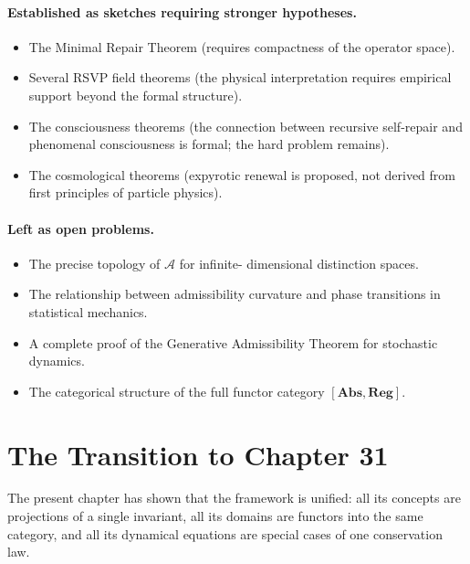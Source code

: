 \documentclass[12pt,twoside,openright]{book}
\newcommand{\adm}{\mathcal{A}}
\begin{document}
\paragraph{Established as sketches requiring stronger
hypotheses.}
\begin{itemize}
  \item The Minimal Repair Theorem
        (requires compactness of the operator space).
  \item Several RSVP field theorems
        (the physical interpretation requires empirical
        support beyond the formal structure).
  \item The consciousness theorems
        (the connection between recursive self-repair
        and phenomenal consciousness is formal;
        the hard problem remains).
  \item The cosmological theorems
        (expyrotic renewal is proposed, not derived
        from first principles of particle physics).
\end{itemize}

\paragraph{Left as open problems.}
\begin{itemize}
  \item The precise topology of $\adm$ for infinite-
        dimensional distinction spaces.
  \item The relationship between admissibility curvature
        and phase transitions in statistical mechanics.
  \item A complete proof of the Generative Admissibility
        Theorem for stochastic dynamics.
  \item The categorical structure of the full functor
        category $[\mathbf{Abs}, \mathbf{Reg}]$.
\end{itemize}

\section{The Transition to Chapter 31}
\label{sec:ch30-transition}

The present chapter has shown that the framework is
unified: all its concepts are projections of a single
invariant, all its domains are functors into the same
category, and all its dynamical equations are
special cases of one conservation law.
\end{document}
